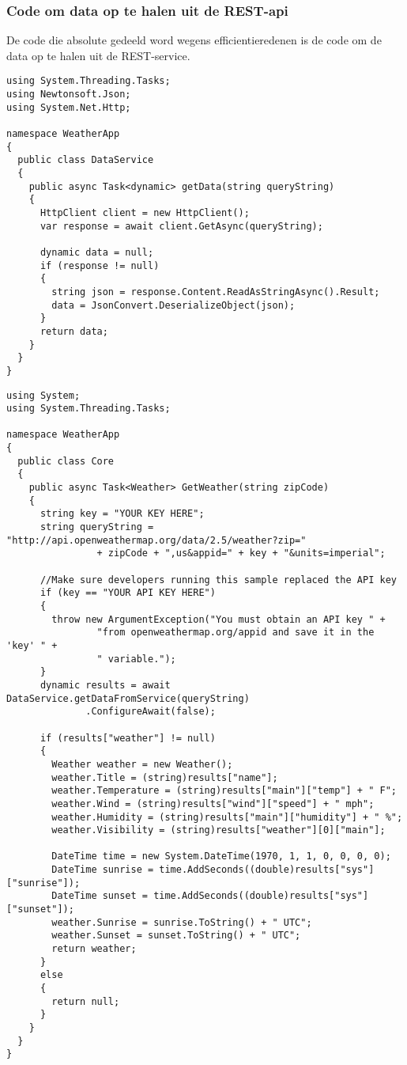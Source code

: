 \subsubsection{Code om data op te halen uit de REST-api}
De code die absolute gedeeld word wegens efficientieredenen is de code om de data op te halen uit de REST-service.





\begin{lstlisting}
using System.Threading.Tasks;
using Newtonsoft.Json;
using System.Net.Http;

namespace WeatherApp
{
  public class DataService
  {
    public async Task<dynamic> getData(string queryString)
    {
      HttpClient client = new HttpClient();
      var response = await client.GetAsync(queryString);

      dynamic data = null;
      if (response != null)
      {
        string json = response.Content.ReadAsStringAsync().Result;
        data = JsonConvert.DeserializeObject(json);
      }
      return data;
    }
  }
}

\end{lstlisting}
\begin{lstlisting}
using System;
using System.Threading.Tasks;

namespace WeatherApp
{
  public class Core
  {
    public async Task<Weather> GetWeather(string zipCode)
    {
      string key = "YOUR KEY HERE";
      string queryString = "http://api.openweathermap.org/data/2.5/weather?zip="
                + zipCode + ",us&appid=" + key + "&units=imperial";

      //Make sure developers running this sample replaced the API key
      if (key == "YOUR API KEY HERE")
      {
        throw new ArgumentException("You must obtain an API key " +
                "from openweathermap.org/appid and save it in the 'key' " +
                " variable.");
      }
      dynamic results = await DataService.getDataFromService(queryString)
              .ConfigureAwait(false);

      if (results["weather"] != null)
      {
        Weather weather = new Weather();
        weather.Title = (string)results["name"];
        weather.Temperature = (string)results["main"]["temp"] + " F";
        weather.Wind = (string)results["wind"]["speed"] + " mph";
        weather.Humidity = (string)results["main"]["humidity"] + " %";
        weather.Visibility = (string)results["weather"][0]["main"];

        DateTime time = new System.DateTime(1970, 1, 1, 0, 0, 0, 0);
        DateTime sunrise = time.AddSeconds((double)results["sys"]["sunrise"]);
        DateTime sunset = time.AddSeconds((double)results["sys"]["sunset"]);
        weather.Sunrise = sunrise.ToString() + " UTC";
        weather.Sunset = sunset.ToString() + " UTC";
        return weather;
      }
      else
      {
        return null;
      }
    }
  }
}
\end{lstlisting}

